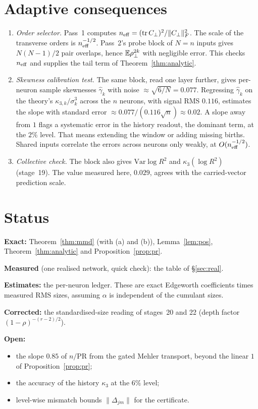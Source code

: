\section{Adaptive consequences}\label{sec:adapt}
\begin{enumerate}[label=(\roman*),leftmargin=1.6em,itemsep=1pt,topsep=1pt]
\item \emph{Order selector.} Pass~1 computes $n_{\rm eff}=(\operatorname{tr}C_\perp)^2/\|C_\perp\|_F^2$. The scale of the transverse orders is
$n_{\rm eff}^{-1/2}$. Pass~2's probe block of $N=n$ inputs gives $N(N-1)/2$ pair overlaps, hence $\mathbb{E}\rho_\perp^{2k}$ with negligible
error. This checks $n_{\rm eff}$ and supplies the tail term of Theorem~\ref{thm:analytic}.
\item \emph{Skewness calibration test.} The same block, read one layer further, gives per-neuron sample
skewnesses $\hat\gamma_k$ with noise $\approx\sqrt{6/N}=0.077$. Regressing $\hat\gamma_k$ on the theory's
$\kappa_{3,k}/\sigma_k^3$ across the $n$ neurons, with signal RMS $0.116$, estimates the slope with standard error
$\approx0.077/(0.116\sqrt n)\approx0.02$. A slope away from $1$ flags a systematic error in the history readout,
the dominant term, at the $2\%$ level. That means extending the window or adding missing births. Shared
inputs correlate the errors across neurons only weakly, at $O(n_{\rm eff}^{-1/2})$.
\item \emph{Collective check.} The block also gives $\mathrm{Var}\log R^2$ and $\kappa_3(\log R^2)$ (stage~19). The value measured
here, $0.029$, agrees with the carried-vector prediction scale.
\end{enumerate}

\section*{Status}
\noindent\textbf{Exact:} Theorem~\ref{thm:mmd} (with (a) and (b)), Lemma~\ref{lem:pos},
Theorem~\ref{thm:analytic} and Proposition~\ref{prop:pr}.

\noindent\textbf{Measured} (one realised network, quick check): the table of \S\ref{sec:real}.

\noindent\textbf{Estimates:} the per-neuron ledger. These are exact Edgeworth coefficients times measured RMS
sizes, assuming $\alpha$ is independent of the cumulant sizes.

\noindent\textbf{Corrected:} the standardised-size reading of stages~20 and 22 (depth factor
$(1-\rho)^{-(r-2)/2}$).

\noindent\textbf{Open:}
\begin{itemize}[leftmargin=1.2em,itemsep=0pt,topsep=1pt]
\item the slope $0.85$ of $n/\mathrm{PR}$ from the gated Mehler transport, beyond the linear $1$ of
Proposition~\ref{prop:pr};
\item the accuracy of the history $\kappa_3$ at the $6\%$ level;
\item level-wise mismatch bounds $\|\Delta_{jm}\|$ for the certificate.
\end{itemize}
